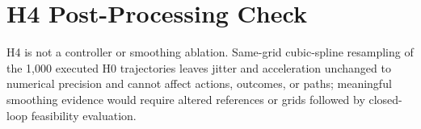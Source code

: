 \documentclass[conference]{IEEEtran}
\begin{document}
\appendix
\section{H4 Post-Processing Check}
H4 is not a controller or smoothing ablation. Same-grid cubic-spline resampling of the 1,000 executed H0 trajectories leaves jitter and acceleration unchanged to numerical precision and cannot affect actions, outcomes, or paths; meaningful smoothing evidence would require altered references or grids followed by closed-loop feasibility evaluation.



\end{document}
